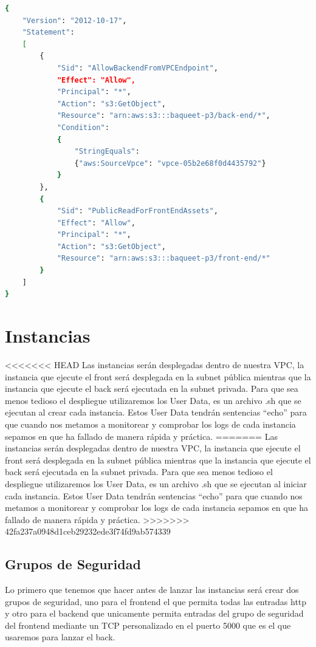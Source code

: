 \documentclass{article}
\begin{document}
	\begin{lstlisting}[style=consola, language=bash, caption={política-s3.json}]
{
    "Version": "2012-10-17",
    "Statement": 
    [
        {
            "Sid": "AllowBackendFromVPCEndpoint",
            "Effect": "Allow",
            "Principal": "*",
            "Action": "s3:GetObject",
            "Resource": "arn:aws:s3:::baqueet-p3/back-end/*",
            "Condition": 
            {
                "StringEquals": 
				{"aws:SourceVpce": "vpce-05b2e68f0d4435792"}
            }
        },
        {
            "Sid": "PublicReadForFrontEndAssets",
            "Effect": "Allow",
            "Principal": "*",
            "Action": "s3:GetObject",
            "Resource": "arn:aws:s3:::baqueet-p3/front-end/*"
        }
    ]
}\end{lstlisting}

	\section{Instancias}
<<<<<<< HEAD
	Las instancias serán desplegadas dentro de nuestra VPC, la instancia que ejecute el front será desplegada en la subnet pública mientras que la instancia que ejecute el back será ejecutada en la subnet privada. Para que sea menos tedioso el despliegue utilizaremos los User Data, es un archivo .sh que se ejecutan al crear cada instancia. Estos User Data tendrán sentencias ``echo'' para que cuando nos metamos a monitorear y comprobar los logs de cada instancia sepamos en que ha fallado de manera rápida y práctica.
=======
	Las instancias serán desplegadas dentro de nuestra VPC, la instancia que ejecute el front será desplegada en la subnet pública mientras que la instancia que ejecute el back será ejecutada en la subnet privada. Para que sea menos tedioso el despliegue utilizaremos los User Data, es un archivo .sh que se ejecutan al iniciar cada instancia. Estos User Data tendrán sentencias ``echo'' para que cuando nos metamos a monitorear y comprobar los logs de cada instancia sepamos en que ha fallado de manera rápida y práctica.
>>>>>>> 42fa237a0948d1ceb29232ede3f74fd9ab574339

	\subsection{Grupos de Seguridad}
	Lo primero que tenemos que hacer antes de lanzar las instancias será crear dos grupos de seguridad, uno para el frontend el que permita  todas las entradas http y otro para el backend que unicamente permita entradas del grupo de seguridad del frontend mediante un TCP personalizado en el puerto 5000 que es el que usaremos para lanzar el back.
\end{document}
